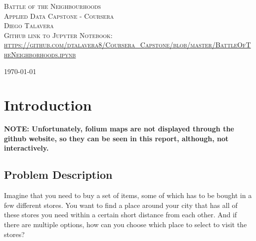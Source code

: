 \documentclass{article}
\begin{document}
	
	\begin{titlepage}
		\center
		\newcommand{\HRule}{\rule{\linewidth}{0.5mm}}
			\textsc{\Huge Battle of the Neighbourhoods}\\[1.5cm]
			\textsc{\LARGE Applied Data Capstone - Coursera}\\[0.3cm]
			\textsc{\large Diego Talavera}\\[0.5cm]
		\vspace{3cm}
		\textsc{\LARGE Github link to Jupyter Notebook:\\ \url{https://github.com/dtalavera8/Coursera_Capstone/blob/master/BattleOfTheNeighborhoods.ipynb}}
			\vfill\vfill\vfill %
			
			{\large\today} %
	\end{titlepage}
	
	
	\newpage				%
	\renewcommand{\contentsname}{Table of Contents}
	\tableofcontents		%
	
	
	\newpage
	\section{Introduction}
	\textbf{NOTE: Unfortunately, folium maps are not displayed through the github website, so they can be seen in this report, although, not interactively.}
	\subsection{Problem Description}
		Imagine that you need to buy a set of items, some of which has to be bought in a few different stores. You want to find a place around your city that has all of these stores you need within a certain short distance from each other. And if there are multiple options, how can you choose which place to select to visit the stores?
	
\end{document}
